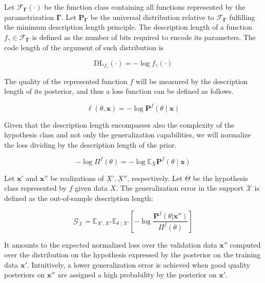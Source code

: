 \begin{definition}
    Let $\mathcal{F}_{\bm{\Gamma}}(\cdot)$ be the function class containing all functions 
    represented by the parametrization $\bm{\Gamma}$. Let $\mathbf{P}_{\bm{\Gamma}}$ be the
    universal distribution relative to $\mathcal{F}_{\bm{\Gamma}}$ fulfilling the minimum
    description length principle. The description length of a function $f_\gamma \in \mathcal{F}_{\bm{\Gamma}}$ 
    is defined as the number of bits required to encode its parameters. The code length
    of the argument of such distribution is

    $$
    \text{DL}_{f_{\gamma}}(\cdot) = -\log f_{\gamma}(\cdot)
    $$
\end{definition}

The quality of the represented function $f$ will be measured by the description
length of its posterior, and thus a loss function can be defined as follows.

$$
    \ell (\theta, \bm{x}) = - \log \mathbf{P}^f (\theta \mid \bm {x})
$$



Given that the description length encompasses also the complexity of the hypothesis
class and not only the generalization capabilities, we will normalize the loss dividing by the
description length of the prior.

$$
    - \log \Pi^f (\theta) = - \log \mathbb{E}_X \mathbf{P}^f (\theta \mid \bm{x})
$$

\begin{definition}
    Let $\bm{x'}$ and $\bm{x''}$ be realizations of $\underbar{X}', \underbar{X}''$, respectively.
    Let $\Theta$ be the hypothesis class represented by $f$ given data $X$. The generalization error 
    in the support $\mathcal{X}$ is defined as the out-of-sample description length:

    $$
        \mathcal{G}_{\mathcal{X}} = \mathbb{E}_{X', X''} \mathbb{E}_{\theta \mid X'} \left[ - \log \frac{\mathbf{P}^f(\theta | \bm{x}'')}{\Pi^f (\theta)} \right]
    $$
    
\end{definition}



It amounts to the expected normalized loss over the validation data $\bm{x}''$ computed
over the distribution on the hypothesis expressed by the posterior on the training data $\bm{x}'$.
Intuitively, a lower generalization error is achieved when good quality posteriors on $\bm{x}''$ are 
assigned a high probability by the posterior on $\bm{x}'$. 

